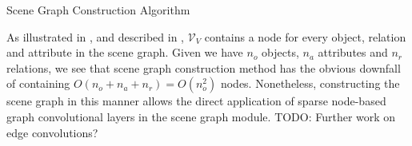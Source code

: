 \begin{algorithm}
    \caption[Scene Graph Construction Algorithm]{Scene Graph Construction Algorithm}
    \label{algorithm:scene_graph_construction}
\end{algorithm}

As illustrated in \figureautorefname{ \ref{fig:model_overview}}, and described in \algorithmcfname{ \ref{algorithm:scene_graph_construction}},  \(\mathcal{V}_V\) contains a node for every object, relation and attribute in the scene graph. Given we have \(n_o\) objects, \(n_a\) attributes and \(n_r\) relations, we see that scene graph construction method has the obvious downfall of containing \(O(n_o + n_a + n_r) = O(n_o^2)\) nodes. Nonetheless, constructing the scene graph in this manner allows the direct application of sparse node-based graph convolutional layers in the scene graph module.
{\color{red} TODO: Further work on edge convolutions?}


